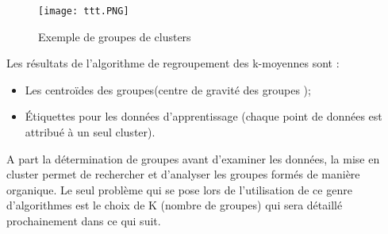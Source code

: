 \begin{figure}[h!]
      \centering
      \texttt{[image: ttt.PNG]}
      
    \caption{Exemple de groupes de clusters}
    \label{fig:tt}
\end{figure}
\newpage
Les résultats de l'algorithme de regroupement des k-moyennes sont :
\begin{itemize}
    \item Les centroïdes des groupes(centre de gravité des groupes );
    \item  Étiquettes pour les données d'apprentissage (chaque point de données est attribué à un seul cluster).
\end{itemize}
A part la détermination de groupes avant d'examiner les données, la mise en cluster permet de rechercher et d'analyser les groupes formés de manière organique. Le seul problème qui se pose lors de l’utilisation de ce genre d’algorithmes est le choix de K (nombre de groupes) qui sera détaillé prochainement dans ce qui suit.

